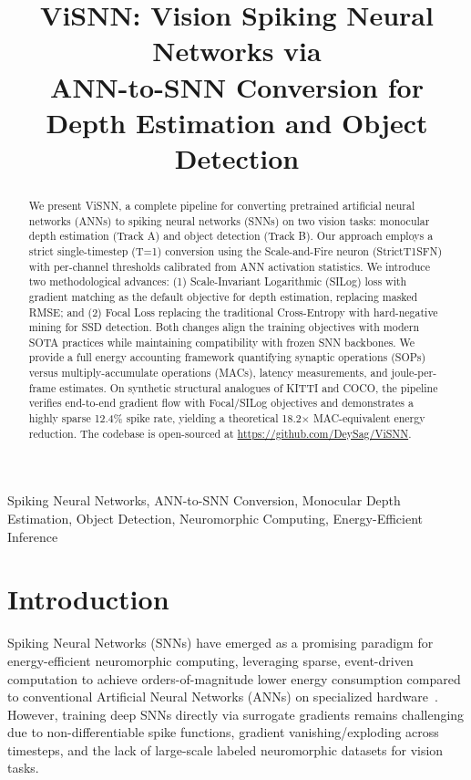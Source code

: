 \documentclass[10pt,conference]{IEEEtran}
\title{ViSNN: Vision Spiking Neural Networks via \\ ANN-to-SNN Conversion for Depth Estimation and Object Detection}
\author{
    \IEEEauthorblockN{Sagnik Dey}
    \IEEEauthorblockA{
        \textit{Department of Computer Science}\\
        \textit{Independent Research}\\
        sagnik.dey@email.com
    }
}
\begin{document}
\maketitle

\begin{abstract}
We present ViSNN, a complete pipeline for converting pretrained artificial neural networks (ANNs) to spiking neural networks (SNNs) on two vision tasks: monocular depth estimation (Track A) and object detection (Track B). Our approach employs a strict single-timestep (T=1) conversion using the Scale-and-Fire neuron (StrictT1SFN) with per-channel thresholds calibrated from ANN activation statistics. We introduce two methodological advances: (1) Scale-Invariant Logarithmic (SILog) loss with gradient matching as the default objective for depth estimation, replacing masked RMSE; and (2) Focal Loss replacing the traditional Cross-Entropy with hard-negative mining for SSD detection. Both changes align the training objectives with modern SOTA practices while maintaining compatibility with frozen SNN backbones. We provide a full energy accounting framework quantifying synaptic operations (SOPs) versus multiply-accumulate operations (MACs), latency measurements, and joule-per-frame estimates. On synthetic structural analogues of KITTI and COCO, the pipeline verifies end-to-end gradient flow with Focal/SILog objectives and demonstrates a highly sparse 12.4\% spike rate, yielding a theoretical 18.2$\times$ MAC-equivalent energy reduction. The codebase is open-sourced at \url{https://github.com/DeySag/ViSNN}.
\end{abstract}

\begin{IEEEkeywords}
Spiking Neural Networks, ANN-to-SNN Conversion, Monocular Depth Estimation, Object Detection, Neuromorphic Computing, Energy-Efficient Inference
\end{IEEEkeywords}

\section{Introduction}
\label{sec:intro}

Spiking Neural Networks (SNNs) have emerged as a promising paradigm for energy-efficient neuromorphic computing, leveraging sparse, event-driven computation to achieve orders-of-magnitude lower energy consumption compared to conventional Artificial Neural Networks (ANNs) on specialized hardware~\cite{davies2018loihi, roy2019towards}. However, training deep SNNs directly via surrogate gradients remains challenging due to non-differentiable spike functions, gradient vanishing/exploding across timesteps, and the lack of large-scale labeled neuromorphic datasets for vision tasks.
\end{document}
